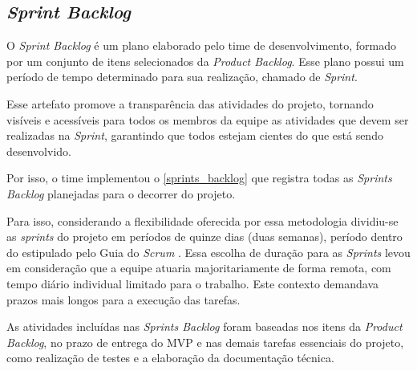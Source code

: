 \documentclass[
	12pt,				%
	openany,			%
	twoside,			%
	a4paper,			%
	english,			%
	french,				%
	spanish,			%
	brazil				%
	]{abntex2}
\begin{document}
\subsection{\textit{Sprint Backlog}}
O \textit{Sprint Backlog} é um plano elaborado pelo time de desenvolvimento, formado por um conjunto de itens selecionados da \textit {Product Backlog}. Esse plano possui um período de tempo determinado para sua realização, chamado de \textit {Sprint}. 

Esse artefato promove a transparência das atividades do projeto, tornando visíveis e acessíveis para todos os membros da equipe as atividades que devem ser realizadas na \textit {Sprint}, garantindo que todos estejam cientes do que está sendo desenvolvido.

Por isso, o time implementou o \autoref{sprints_backlog} que registra todas as \textit {Sprints Backlog} planejadas para o decorrer do projeto.

Para isso, considerando a flexibilidade oferecida por essa metodologia dividiu-se as \textit {sprints} do projeto em períodos de quinze dias (duas semanas), período dentro do estipulado pelo Guia do \textit{Scrum} \cite{scrumguide}. Essa escolha de duração para as \textit {Sprints} levou em consideração que a equipe atuaria majoritariamente de forma remota, com tempo diário individual limitado para o trabalho. Este contexto demandava prazos mais longos para a execução das tarefas.

As atividades incluídas nas \textit {Sprints Backlog} foram baseadas nos itens da \textit {Product Backlog}, no prazo de entrega do MVP e nas demais tarefas essenciais do projeto, como realização de testes e a elaboração da documentação técnica.
\end{document}
